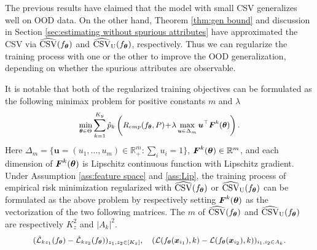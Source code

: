 \documentclass{article} %
\newcommand{\btheta}{\text{\boldmath{$\theta$}}}
\newcommand{\bx}{\boldsymbol{x}}
\newcommand{\bF}{\boldsymbol{F}}
\newcommand{\bu}{\boldsymbol{u}}
\newcommand{\bbR}{\mathbb{R}}
\newcommand{\cL}{\mathcal{L}}
\begin{document}
	The previous results have claimed that the model with small CSV generalizes well on OOD data. On the other hand, Theorem \ref{thm:gen bound} and discussion in Section \ref{sec:estimating without spurious attributes} have approximated the CSV via $\widehat{\rm{CSV}}(f_{\btheta})$ and $\widehat{\rm{CSV}}_{\rm U}(f_{\btheta})$, respectively. Thus we can regularize the training process with one or the other to improve the OOD generalization, depending on whether the spurious attributes are observable. 
	\par
	It is notable that both of the regularized training objectives can be formulated as the following minimax problem for positive constants $m$ and  $\lambda$
	\begin{equation}\label{eq:minimax problem}
		\small
		\min_{\btheta\in\Theta}\sum_{k=1}^{K_{y}}\hat{p}_{k}\left(R_{emp}(f_{\btheta}, P) \!+\! \lambda \max_{\bu\in\Delta_{m}}\bu^{\top}\bF^{k}(\btheta)\right).
	\end{equation}
	Here $\Delta_{m} = \{\bu = (u_{1},\dots, u_{m})\in\bbR^{m}_{+}: \sum_{i}u_{i} = 1\}$, $\bF^{k}(\btheta)\in\bbR^{m}$, and each dimension of $\bF^{k}(\btheta)$ is Lipschitz continuous function with Lipschitz gradient. Under Assumption \ref{ass:feature space} and \ref{ass:Lip}, the training process of empirical risk minimization regularized with $\widehat{\rm{CSV}}(f_{\btheta})$ or $\widehat{\rm{CSV}}_{\rm U}(f_{\btheta})$ can be formulated as the above problem by respectively setting $\bF^{k}(\btheta)$ as the vectorization of the two following matrices. The $m$ of $\widehat{\rm{CSV}}(f_{\btheta})$ and  $\widehat{\rm{CSV}}_{\rm U}(f_{\btheta})$ are respectively $K_{z}^{2}$ and $|A_{k}|^{2}$. 
	\begin{equation}\label{eq:csv for f}
		\small
		(\hat{\cL}_{kz_{1}}(f_{\btheta}) - \hat{\cL}_{kz_{2}}(f_{\btheta}))_{z_{1}, z_{2}\in[K_{z}]}, \quad (\cL(f_{\btheta}(\bx_{i_{1}}), k) - \cL(f_{\btheta}(\bx_{i_{2}}), k))_{i_{1},i_{2} \in A_{k}}.
	\end{equation}
\end{document}

